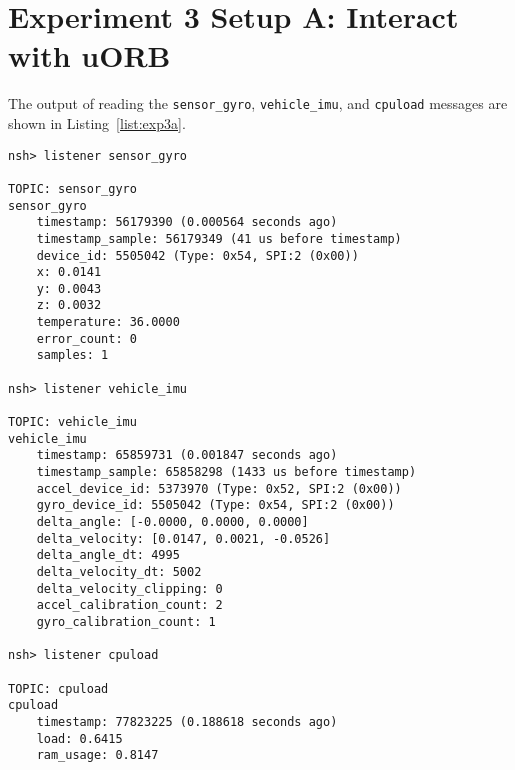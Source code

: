 \section*{Experiment 3 Setup A: Interact with uORB}
The output of reading the \texttt{sensor\_gyro},  \texttt{vehicle\_imu}, and \texttt{cpuload} messages are shown in Listing~\ref{list:exp3a}.

\begin{lstlisting}[caption=uORB Messages,label=list:exp3a]
nsh> listener sensor_gyro

TOPIC: sensor_gyro
sensor_gyro
    timestamp: 56179390 (0.000564 seconds ago)
    timestamp_sample: 56179349 (41 us before timestamp)
    device_id: 5505042 (Type: 0x54, SPI:2 (0x00))
    x: 0.0141
    y: 0.0043
    z: 0.0032
    temperature: 36.0000
    error_count: 0
    samples: 1

nsh> listener vehicle_imu

TOPIC: vehicle_imu
vehicle_imu
    timestamp: 65859731 (0.001847 seconds ago)
    timestamp_sample: 65858298 (1433 us before timestamp)
    accel_device_id: 5373970 (Type: 0x52, SPI:2 (0x00))
    gyro_device_id: 5505042 (Type: 0x54, SPI:2 (0x00))
    delta_angle: [-0.0000, 0.0000, 0.0000]
    delta_velocity: [0.0147, 0.0021, -0.0526]
    delta_angle_dt: 4995
    delta_velocity_dt: 5002
    delta_velocity_clipping: 0
    accel_calibration_count: 2
    gyro_calibration_count: 1

nsh> listener cpuload

TOPIC: cpuload
cpuload
    timestamp: 77823225 (0.188618 seconds ago)
    load: 0.6415
    ram_usage: 0.8147
\end{lstlisting}    